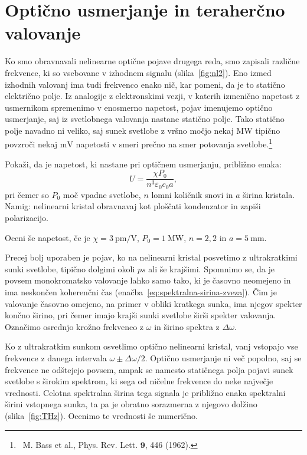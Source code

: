 \section{Optično usmerjanje in teraherčno valovanje}
Ko smo obravnavali nelinearne optične pojave drugega reda, smo zapisali
različne frekvence, ki so vsebovane v izhodnem signalu (slika~\ref{fig:nl2}). Eno izmed
izhodnih valovanj ima tudi frekvenco enako nič, kar pomeni, da je to statično električno polje. Iz analogije
z elektronskimi vezji, v katerih izmenično napetost z usmernikom spremenimo v enosmerno napetost, 
pojav imenujemo optično usmerjanje, saj iz svetlobnega valovanja nastane statično polje. Tako statično 
polje navadno ni veliko, saj sunek svetlobe z vršno močjo nekaj $\si{\mega\watt}$ tipično povzroči 
nekaj $\si{\milli\volt}$ napetosti v smeri prečno na smer potovanja svetlobe.\footnote{~M. Bass
et al., Phys. Rev. Lett. $\mathbf{9}$, 446 (1962).}

\begin{naloga}
Pokaži, da je napetost, ki nastane pri optičnem usmerjanju, približno enaka:
\begin{equation}
U = \frac{\chi P_0}{n^3 \varepsilon_0 c_0 a},
\end{equation}
pri čemer so $P_0$ moč vpadne svetlobe, $n$ lomni količnik snovi in $a$ širina kristala. 
Namig: nelinearni kristal obravnavaj kot ploščati kondenzator in zapiši polarizacijo.

Oceni še napetost, če je
$\chi = 3~\si{\pico\meter/\volt}$, $P_0 = 1~\si{\mega\watt}$, $n = 2,2$ in $a = 5~\si{\milli\metre}$. 
\end{naloga}

Precej bolj uporaben je pojav, ko na nelinearni kristal posvetimo z ultrakratkimi 
sunki svetlobe, tipično dolgimi okoli $\si{ps}$ ali še krajšimi. Spomnimo se, da je povsem 
monokromatsko valovanje lahko samo tako, 
ki je časovno neomejeno in ima neskončen koherenčni čas
(enačba~\ref{eq:spektralna-sirina-zveza}). 
Čim je valovanje časovno omejeno, na primer v obliki kratkega sunka, ima njegov spekter 
končno širino, pri čemer imajo krajši sunki svetlobe širši spekter valovanja. Označimo 
osrednjo krožno frekvenco z $\omega$ in širino spektra z $\Delta \omega$. 

Ko z ultrakratkim sunkom osvetlimo optično 
nelinearni kristal, vanj vstopajo vse frekvence z danega intervala $\omega \pm \Delta \omega/2$.
Optično usmerjanje ni več popolno, saj se frekvence ne odštejejo povsem, ampak se 
namesto statičnega polja pojavi sunek svetlobe s širokim spektrom, ki sega od ničelne
frekvence do neke največje vrednosti. Celotna spektralna širina tega signala je 
približno enaka spektralni širini vstopnega sunka, ta pa je obratno sorazmerna z njegovo dolžino
(slika~\ref{fig:THz}).
Ocenimo te vrednosti še numerično. 

